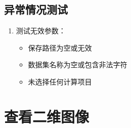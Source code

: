 \documentclass[a4paper,12pt]{report}	%
\begin{document}
\subsection{异常情况测试}
\begin{enumerate}
    \item 测试无效参数：
    \begin{itemize}
        \item 保存路径为空或无效
        \item 数据集名称为空或包含非法字符
        \item 未选择任何计算项目
    \end{itemize}
\end{enumerate}

\section{查看二维图像}
\end{document}
